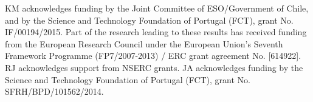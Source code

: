 \documentclass[a4paper,fleqn,usenatbib]{mnras}
\begin{document}
\vspace{0.5cm} 

KM acknowledges funding by the Joint Committee of ESO/Government of Chile, and by the Science and Technology Foundation of Portugal (FCT), grant No. IF/00194/2015.
Part of the research leading to these results has received funding from the European Research Council 
under the European Union's Seventh Framework Programme (FP7/2007-2013) / ERC grant agreement No. [614922].
RJ acknowledges support from NSERC grants. JA acknowledges funding by the Science and Technology Foundation of Portugal (FCT), grant No. SFRH/BPD/101562/2014.



\end{document}

